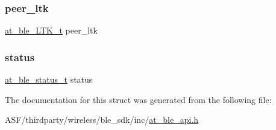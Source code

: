 \mbox{\label{structat__ble__pair__done__t_abeffd33020743cbfbcba6531551aba44}} 
\subsubsection{\texorpdfstring{peer\_ltk}{peer\_ltk}}
{\footnotesize\ttfamily \mbox{\hyperlink{structat__ble___l_t_k__t}{at\+\_\+ble\+\_\+\+L\+T\+K\+\_\+t}} peer\+\_\+ltk}

\mbox{\label{structat__ble__pair__done__t_a0b48093fc2030779fc47e5216f8019e2}} 
\subsubsection{\texorpdfstring{status}{status}}
{\footnotesize\ttfamily \mbox{\hyperlink{group__error__codes__group_ga3b1db9b95feb157b3c188ca27fe76988}{at\+\_\+ble\+\_\+status\+\_\+t}} status}



The documentation for this struct was generated from the following file\+:\begin{DoxyCompactItemize}
\item 
A\+S\+F/thirdparty/wireless/ble\+\_\+sdk/inc/\mbox{\hyperlink{at__ble__api_8h}{at\+\_\+ble\+\_\+api.\+h}}\end{DoxyCompactItemize}
